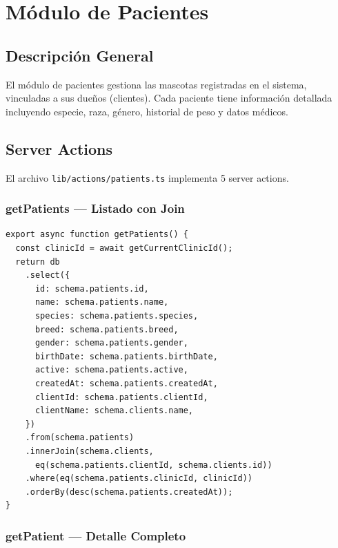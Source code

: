 \chapter{M\'odulo de Pacientes}

\section{Descripci\'on General}

El m\'odulo de pacientes gestiona las mascotas registradas en el sistema,
vinculadas a sus due\~nos (clientes). Cada paciente tiene informaci\'on
detallada incluyendo especie, raza, g\'enero, historial de peso y datos
m\'edicos.

\section{Server Actions}

El archivo \texttt{lib/actions/patients.ts} implementa 5 server actions.

\subsection{getPatients --- Listado con Join}

\begin{lstlisting}[style=typescript, caption=getPatients - Listado con join a clientes]
export async function getPatients() {
  const clinicId = await getCurrentClinicId();
  return db
    .select({
      id: schema.patients.id,
      name: schema.patients.name,
      species: schema.patients.species,
      breed: schema.patients.breed,
      gender: schema.patients.gender,
      birthDate: schema.patients.birthDate,
      active: schema.patients.active,
      createdAt: schema.patients.createdAt,
      clientId: schema.patients.clientId,
      clientName: schema.clients.name,
    })
    .from(schema.patients)
    .innerJoin(schema.clients,
      eq(schema.patients.clientId, schema.clients.id))
    .where(eq(schema.patients.clinicId, clinicId))
    .orderBy(desc(schema.patients.createdAt));
}
\end{lstlisting}

\subsection{getPatient --- Detalle Completo}

